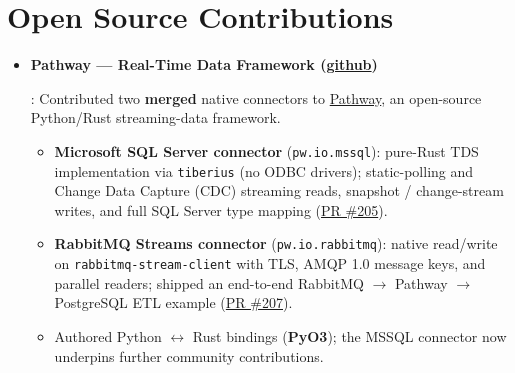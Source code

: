 \documentclass[letterpaper,10pt]{article}
\newcommand{\resumeItem}[2]{
  \item\small{
    \textbf{#1}{: #2 \vspace{-2pt}}
  }
}
\newcommand{\resumeSubItem}[2]{\resumeItem{#1}{#2}\vspace{-4pt}}
\newcommand{\resumeSubHeadingListStart}{\begin{itemize}[leftmargin=*]}
\newcommand{\resumeSubHeadingListEnd}{\end{itemize}}
\newcommand{\shorterSection}[1]{\vspace{-10pt}\section{#1}}
\begin{document}
\shorterSection{\textcolor{titleblue}{Open Source Contributions}}
  \resumeSubHeadingListStart
    \resumeSubItem{Pathway --- Real-Time Data Framework (\href{https://github.com/pathwaycom/pathway}{\textcolor{linkblue}{github}})}
      {Contributed two \textbf{merged} native connectors to \href{https://pathway.com}{\textcolor{linkblue}{Pathway}}, an open-source Python/Rust streaming-data framework.
      \begin{itemize}
        \item \textbf{Microsoft SQL Server connector} (\texttt{pw.io.mssql}): pure-Rust TDS implementation via \texttt{tiberius} (no ODBC drivers); static-polling and Change Data Capture (CDC) streaming reads, snapshot / change-stream writes, and full SQL Server type mapping (\href{https://github.com/pathwaycom/pathway/pull/205}{\textcolor{linkblue}{PR \#205}}).
        \item \textbf{RabbitMQ Streams connector} (\texttt{pw.io.rabbitmq}): native read/write on \texttt{rabbitmq-stream-client} with TLS, AMQP 1.0 message keys, and parallel readers; shipped an end-to-end RabbitMQ $\rightarrow$ Pathway $\rightarrow$ PostgreSQL ETL example (\href{https://github.com/pathwaycom/pathway/pull/207}{\textcolor{linkblue}{PR \#207}}).
        \item Authored Python $\leftrightarrow$ Rust bindings (\textbf{PyO3}); the MSSQL connector now underpins further community contributions.
      \end{itemize}
      }
  \resumeSubHeadingListEnd
\end{document}
